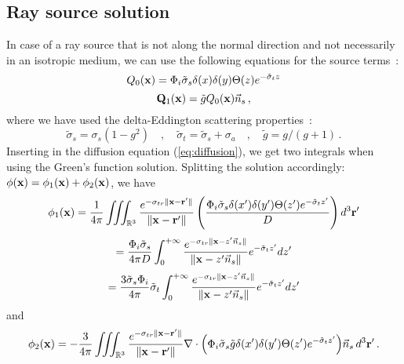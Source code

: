 \documentclass[10pt,a4paper]{article}
\begin{document}
\subsection{Ray source solution}

In case of a ray source that is not along the normal direction and not necessarily in an isotropic medium, we can use the following equations for the source terms~\cite{menon05}:
$$
{Q_0}(\mathbf{x}) = \Phi_i \tilde{\sigma}_s \delta(x) \delta(y) \Theta(z) e^{-\tilde{\sigma}_t z}
$$
$$
\mathbf{Q}_1(\mathbf{x}) = \tilde{g} {Q_0}(\mathbf{x}) \vec{n}_s \, ,
$$
where we have used the delta-Eddington scattering properties~\cite{joseph76}:
$$
\tilde{\sigma}_s = \sigma_s(1 - g^2) \quad , \quad \tilde{\sigma}_t = \tilde{\sigma}_s + \sigma_a \quad , \quad \tilde{g} = g/(g + 1) \, .
$$
Inserting in the diffusion equation (\ref{eq:diffusion}), we get two integrals when using the Green's function solution. Splitting the solution accordingly: ${\phi}(\mathbf{x}) = {\phi_1}(\mathbf{x}) + {\phi_2}(\mathbf{x})$, we have
$$
{\phi_1}(\mathbf{x}) = \frac{1}{4 \pi} \iiint_{\mathbb{R}^3} \frac{e^{-\sigma_{tr} \|\mathbf{x} - \mathbf{r}' \|}}{\|\mathbf{x} - \mathbf{r}' \|} \left(   \frac{\Phi_i \tilde{\sigma}_s \delta(x') \delta(y') \Theta(z') e^{-\tilde{\sigma}_t z'}}{D} \right) d^3 \mathbf{r}'
$$
$$
= \frac{\Phi_i \tilde{\sigma}_s}{4 \pi D} \int_{0}^{+\infty} \frac{e^{-\sigma_{tr} \|\mathbf{x} - z' \vec{n}_s\|}}{\|\mathbf{x} - z' \vec{n}_s\|}  e^{-\tilde{\sigma}_t z'} dz'
$$
$$
= \frac{3\tilde{\sigma}_s \Phi_i}{4 \pi} \tilde{\sigma}_t \int_{0}^{+\infty} \frac{e^{-\sigma_{tr} \|\mathbf{x} - z' \vec{n}_s\|}}{\|\mathbf{x} - z' \vec{n}_s\|}  e^{-\tilde{\sigma}_t z'} dz'
$$
and
$$
{\phi_2}(\mathbf{x}) = -\frac{3}{4 \pi} \iiint_{\mathbb{R}^3}  \frac{e^{-\sigma_{tr} \|\mathbf{x} - \mathbf{r}' \|}}{\|\mathbf{x} - \mathbf{r}' \|} \nabla \cdot \left(  \Phi_i \tilde{\sigma}_s \tilde{g} \delta(x') \delta(y') \Theta(z') e^{-\tilde{\sigma}_t z'} \right)\! \vec{n}_s \, d^3 \mathbf{r}' \, .
$$
\end{document}

